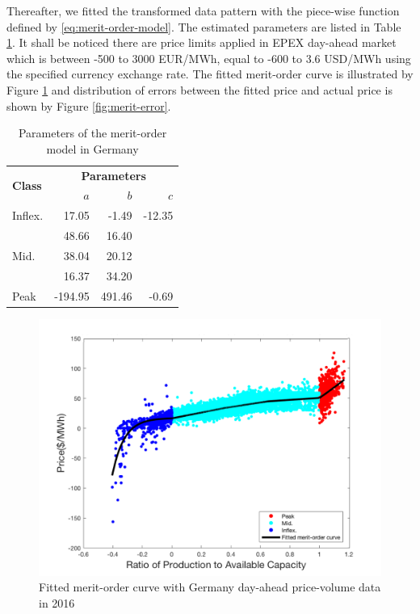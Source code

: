 Thereafter, we fitted the transformed data pattern with the piece-wise function defined by \eqref{eq:merit-order-model}. The estimated parameters are listed in Table \ref{tab:merit}. It shall be noticed there are price limits applied in EPEX day-ahead market\cite{EPEX_price_limit} which is between -500 to 3000 EUR/MWh, equal to -600 to 3.6 USD/MWh using the specified currency exchange rate. The fitted merit-order curve is illustrated by Figure \ref{fig:merit-fitted} and distribution of errors between the fitted price and actual price is shown by Figure \ref{fig:merit-error}.

\begin{table}[h!]
	\centering
	\begin{tabular}{l  r r r}
		\hline
		\multirow{2}{*}{\textbf{Class}} & \multicolumn{3}{c}{\textbf{Parameters}}\\
		 & $a$ & $b$ & $c$\\
		\hline
		Inflex. & 17.05 & -1.49 & -12.35 \\
		\multirow{3}{*}{Mid.} & 48.66 & 16.40 & \\
		\multirow{3}{*}{} & 38.04 & 20.12 & \\
		\multirow{3}{*}{} & 16.37 & 34.20 & \\
		Peak & -194.95 & 491.46 & -0.69 \\
		\hline
	\end{tabular}
	\caption{Parameters of the merit-order model in Germany}\label{tab:merit}
\end{table}

\begin{figure}[h!]
	\centering
	\includegraphics[width=0.95\linewidth]{Figures/Merit-order-fitted}
	\caption{Fitted merit-order curve with Germany day-ahead price-volume data in 2016}
	\label{fig:merit-fitted}
\end{figure}

